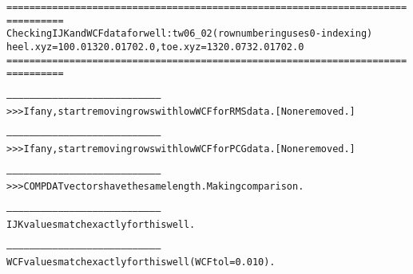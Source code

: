 \begin{alltt}
================================================================================
Checking IJK and WCF data for well: tw06_02 (row numbering uses 0-indexing)
heel.xyz = 100.0 1320.0 1702.0, toe.xyz = 1320.0 732.0 1702.0
================================================================================

--------------------------------------------------------------------------------
>>> If any, start removing rows with low WCF for RMS data. [None removed.]

--------------------------------------------------------------------------------
>>> If any, start removing rows with low WCF for PCG data. [None removed.]

--------------------------------------------------------------------------------
>>> COMPDAT vectors have the same length. Making comparison.

--------------------------------------------------------------------------------
IJK values match exactly for this well.

--------------------------------------------------------------------------------
WCF values match exactly for this well (WCF tol = 0.010).
\end{alltt}
